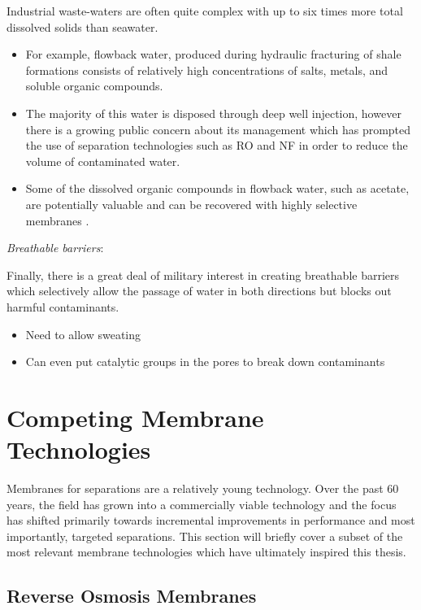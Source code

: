   Industrial waste-waters are often quite complex with up to six times more 
  total dissolved solids than seawater\cite{werber_materials_2016}. 
  \begin{itemize}
    \item For example, flowback water, produced during hydraulic fracturing of
    shale formations consists of relatively high concentrations of salts, metals,
    and soluble organic compounds. 
    \item The majority of this water is disposed through deep well injection, 
    however there is a growing public concern about its management which has 
    prompted the use of separation technologies such as RO and NF in order to 
    reduce the volume of contaminated water.~\cite{gregory_water_2011}
    \item Some of the dissolved organic compounds in flowback water, such as acetate, 
    are potentially valuable and can be recovered with highly selective membranes
    \cite{dischinger_application_2017}.
  \end{itemize}
  
  \textit{Breathable barriers}:
  
  Finally, there is a great deal of military interest in creating breathable 
  barriers which selectively allow the passage of water in both directions but
  blocks out harmful contaminants.
  \begin{itemize}
    \item Need to allow sweating
    \item Can even put catalytic groups in the pores to break down contaminants
  \end{itemize}

  \section{Competing Membrane Technologies}
  
  Membranes for separations are a relatively young technology. Over the past 60 years, 
  the field has grown into a commercially viable technology and the focus has shifted
  primarily towards incremental improvements in performance and most importantly,
  targeted separations. This section will briefly cover a subset of the most relevant
  membrane technologies which have ultimately inspired this thesis.
  
  \subsection{Reverse Osmosis Membranes}
  
